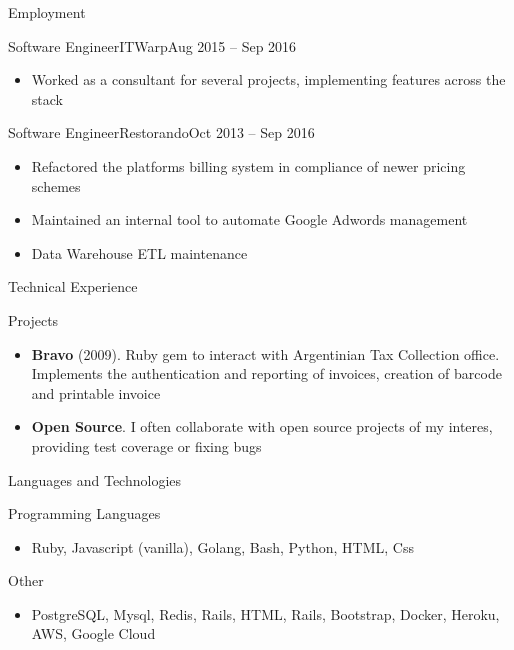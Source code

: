 \documentclass[]{mcdowellcv}
\begin{document}
\begin{cvsection}{Employment}
		\begin{cvsubsection}{Software Engineer}{ITWarp}{Aug 2015 -- Sep 2016}
			\begin{itemize}
				\item Worked as a consultant for several projects, implementing features across the stack
			\end{itemize}
		\end{cvsubsection}

		\begin{cvsubsection}{Software Engineer}{Restorando}{Oct 2013 -- Sep 2016}
			\begin{itemize}
				\item Refactored the platforms billing system in compliance of newer pricing schemes
        				\item Maintained an internal tool to automate Google Adwords management
        				\item Data Warehouse ETL maintenance
			\end{itemize}
		\end{cvsubsection}
	\end{cvsection}
	
	\begin{cvsection}{Technical Experience}
		\begin{cvsubsection}{Projects}{}{}
			\begin{itemize}
				\item \textbf{Bravo} (2009). Ruby gem to interact with Argentinian Tax Collection office. Implements the authentication and reporting of invoices, 
creation of barcode and printable invoice
				\item \textbf{Open Source}. I often collaborate with open source projects of my interes, providing test coverage or fixing bugs
			\end{itemize}
		\end{cvsubsection}
	\end{cvsection}
	
	\begin{cvsection}{Languages and Technologies}
		\begin{cvsubsection}{Programming Languages}{}{}	
			\begin{itemize}
				\item Ruby, Javascript (vanilla), Golang, Bash, Python, HTML, Css
			\end{itemize}
		\end{cvsubsection}
		\begin{cvsubsection}{Other}{}{}
			\begin{itemize}
				\item PostgreSQL, Mysql, Redis, Rails, HTML, Rails, Bootstrap, Docker, Heroku, AWS, Google Cloud
			\end{itemize}
		\end{cvsubsection}
	\end{cvsection}
	
\end{document}
